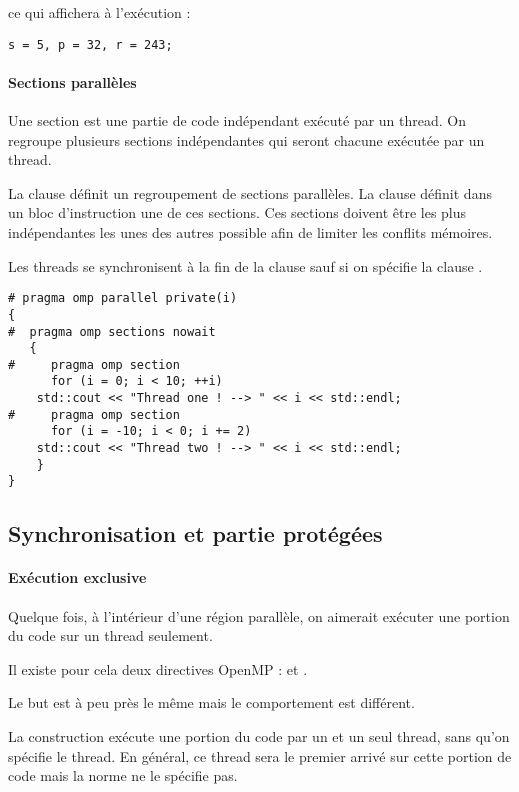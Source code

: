 \documentclass[fleqn,11pt]{article}
\begin{document}
ce qui affichera à l'exécution :

\begin{verbatim}
s = 5, p = 32, r = 243;
\end{verbatim}

\paragraph{Sections parallèles}

Une section est une partie de code indépendant exécuté par un thread. 
On regroupe plusieurs sections indépendantes qui seront chacune exécutée par un thread.

La clause \verb@sections@ définit un regroupement de sections parallèles. La clause \verb@section@ définit
dans un bloc d'instruction une de ces sections. Ces sections doivent être les plus indépendantes les unes
des autres possible afin de limiter les conflits mémoires. 

Les threads se synchronisent à la fin de la clause \verb@sections@ sauf si on spécifie la clause \verb@nowait@.

\begin{lstlisting}
# pragma omp parallel private(i)
{
#  pragma omp sections nowait
   {
#     pragma omp section 
      for (i = 0; i < 10; ++i)
	std::cout << "Thread one ! --> " << i << std::endl;
#     pragma omp section
      for (i = -10; i < 0; i += 2)
	std::cout << "Thread two ! --> " << i << std::endl;
    }
}
\end{lstlisting}

\subsection{Synchronisation et partie protégées}

\paragraph{Exécution exclusive}

Quelque fois, à l'intérieur d'une région parallèle, on aimerait exécuter
une portion du code sur un thread seulement. 

Il existe pour cela deux directives OpenMP : \verb@single@ et \verb@master@.

Le but est à peu près le même mais le comportement est différent.

La construction \verb@single@ exécute une portion du code par un et un seul
thread, sans qu'on spécifie le thread. En général, ce thread sera le premier
arrivé sur cette portion de code mais la norme ne le spécifie pas. 
\end{document}

